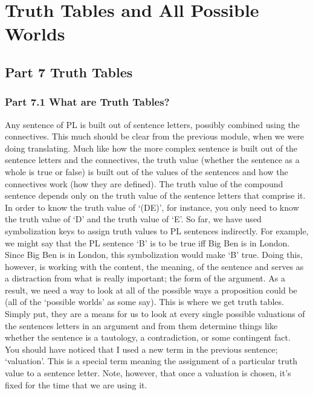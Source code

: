 \part{Truth Tables and All Possible Worlds}
\label{ch.TruthTables}
\chapter{Part 7 Truth Tables}
\section{ Part 7.1 What are Truth Tables?}
Any sentence of PL is built out of sentence letters, possibly combined using the connectives. This much should be clear from the previous module, when we were doing translating. Much like how the more complex sentence is built out of the sentence letters and the connectives, the \gls{truth value} (whether the sentence as a whole is true or false) is built out of the values of the sentences and how the connectives work (how they are defined). The truth value of the compound sentence depends only on the truth value of the sentence letters that comprise it. In order to know the truth value of ‘(D\eand E)’, for instance, you only need to know the truth value of ‘D’ and the truth value of ‘E’. So far, we have used symbolization keys to assign truth values to PL sentences indirectly. For example, we might say that the PL sentence ‘B’ is to be true iff Big Ben is in London. Since Big Ben is in London, this symbolization would make ‘B’ true. Doing this, however, is working with the content, the meaning, of the sentence and serves as a distraction from what is really important; the form of the argument. As a result, we need a way to look at all of the possible ways a proposition could be (all of the `possible worlds' as some say). This is where we get truth tables. Simply put, they are a means for us to look at every single possible valuations of the sentences letters in an argument and from them determine things like whether the sentence is a tautology, a contradiction, or some contingent fact.  You should have noticed that I used a new term in the previous sentence; `\gls{valuation}'. This is a special term meaning the assignment of a particular truth value to a sentence letter. Note, however, that once a valuation is chosen, it's fixed for the time that we are using it. 


